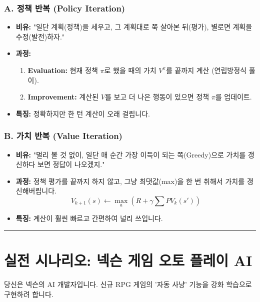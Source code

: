 \documentclass[11pt,a4paper]{book}
\theoremstyle{definition}
\begin{document}
\subsubsection*{A. 정책 반복 (Policy Iteration)}
\begin{itemize}
    \item \textbf{비유:} "일단 계획(정책)을 세우고, 그 계획대로 쭉 살아본 뒤(평가), 별로면 계획을 수정(발전)하자."
    \item \textbf{과정:}
    \begin{enumerate}
        \item \textbf{Evaluation:} 현재 정책 $\pi$로 했을 때의 가치 $V^\pi$를 끝까지 계산 (연립방정식 풀이).
        \item \textbf{Improvement:} 계산된 $V$를 보고 더 나은 행동이 있으면 정책 $\pi$를 업데이트.
    \end{enumerate}
    \item \textbf{특징:} 정확하지만 한 턴 계산이 오래 걸립니다.
\end{itemize}

\subsubsection*{B. 가치 반복 (Value Iteration)}
\begin{itemize}
    \item \textbf{비유:} "멀리 볼 것 없이, 일단 매 순간 가장 이득이 되는 쪽(Greedy)으로 가치를 갱신하다 보면 정답이 나오겠지."
    \item \textbf{과정:} 정책 평가를 끝까지 하지 않고, 그냥 최댓값(max)을 한 번 취해서 가치를 갱신해버립니다.
    $$ V_{k+1}(s) \leftarrow \max_a (R + \gamma \sum P V_k(s')) $$
    \item \textbf{특징:} 계산이 훨씬 빠르고 간편하여 널리 쓰입니다.
\end{itemize}

\vspace{0.5cm}\hrule\vspace{0.5cm}

\section{실전 시나리오: 넥슨 게임 오토 플레이 AI}

\begin{storybox}[title={Scenario: 모바일 RPG 자동 사냥}]
당신은 넥슨의 AI 개발자입니다. 신규 RPG 게임의 '자동 사냥' 기능을 강화 학습으로 구현하려 합니다.
\end{storybox}
\end{document}
